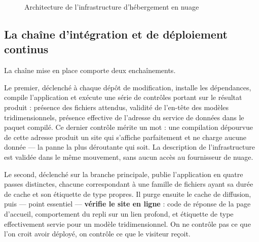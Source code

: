 \begin{figure}[htbp]
\centering
{}
\caption{Architecture de l'infrastructure d'hébergement en nuage}
\label{fig:cloud}
\end{figure}

\subsection{La chaîne d'intégration et de déploiement continus}

La chaîne mise en place comporte deux enchaînements.

Le premier, déclenché à chaque dépôt de modification, installe les dépendances,
compile l'application et exécute une série de contrôles portant sur le résultat
produit : présence des fichiers attendus, validité de l'en-tête des modèles
tridimensionnels, présence effective de l'adresse du service de données dans le
paquet compilé. Ce dernier contrôle mérite un mot : une compilation dépourvue de
cette adresse produit un site qui s'affiche parfaitement et ne charge aucune
donnée — la panne la plus déroutante qui soit. La description de l'infrastructure
est validée dans le même mouvement, sans aucun accès au fournisseur de nuage.

Le second, déclenché sur la branche principale, publie l'application en quatre
passes distinctes, chacune correspondant à une famille de fichiers ayant sa
durée de cache et son étiquette de type propres. Il purge ensuite le cache de
diffusion, puis — point essentiel — \textbf{vérifie le site en ligne} : code de
réponse de la page d'accueil, comportement du repli sur un lien profond, et
étiquette de type effectivement servie pour un modèle tridimensionnel. On ne
contrôle pas ce que l'on croit avoir déployé, on contrôle ce que le visiteur
reçoit.


